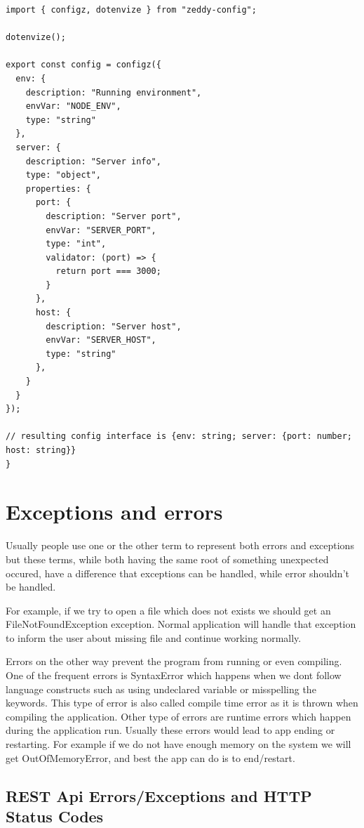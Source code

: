 \documentclass[lang=en,color=green]{elegantbook}
\begin{document}
\begin{verbatim}
import { configz, dotenvize } from "zeddy-config";

dotenvize();

export const config = configz({
  env: {
    description: "Running environment",
    envVar: "NODE_ENV",
    type: "string"
  },
  server: {
    description: "Server info",
    type: "object",
    properties: {
      port: {
        description: "Server port",
        envVar: "SERVER_PORT",
        type: "int",
        validator: (port) => {
          return port === 3000;
        }
      },
      host: {
        description: "Server host",
        envVar: "SERVER_HOST",
        type: "string"
      },
    }
  }
});

// resulting config interface is {env: string; server: {port: number; host: string}}
}
\end{verbatim}

\section{Exceptions and errors}

Usually people use one or the other term to represent both errors and exceptions
but these terms, while both having the same root of something unexpected occured,
have a difference that exceptions can be handled, while error shouldn't be handled.

For example, if we try to open a file which does not exists we should get an
FileNotFoundException exception. Normal application will handle that exception to
inform the user about missing file and continue working normally.

Errors on the other way prevent the program from running or even compiling.
One of the frequent errors is SyntaxError which happens when we dont follow
language constructs such as using undeclared variable or misspelling the keywords.
This type of error is also called compile time error as it is thrown
when compiling the application. Other type of errors are runtime errors
which happen during the application run. Usually these errors would lead to
app ending or restarting. For example if we do not have enough memory on
the system we will get OutOfMemoryError, and best the app can do is to end/restart.

\subsection{REST Api Errors/Exceptions and HTTP Status Codes}
\label{sec:REST Api Errors/Exceptions and HTTP Status Codes}
\end{document}
